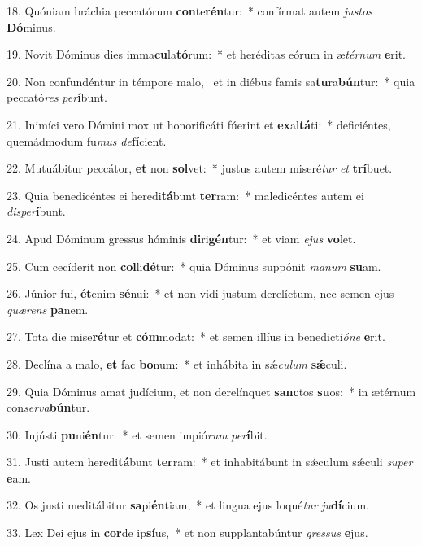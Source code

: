18. Quóniam bráchia peccatórum \textbf{con}te\textbf{rén}tur:~*  confírmat autem \textit{jus}\textit{tos} \textbf{Dó}minus.\

19. Novit Dóminus dies imma\textbf{cu}la\textbf{tó}rum:~*  et heréditas eórum in æ\textit{tér}\textit{num} \textbf{e}rit.\

20. Non confundéntur in témpore malo, \dag\  et in diébus famis sa\textbf{tu}ra\textbf{bún}tur:~*  quia peccató\textit{res} \textit{per}\textbf{í}bunt.\

21. Inimíci vero Dómini mox ut honorificáti fúerint et \textbf{ex}al\textbf{tá}ti:~*  deficiéntes, quemádmodum fu\textit{mus} \textit{de}\textbf{fí}cient.\

22. Mutuábitur peccátor, \textbf{et} non \textbf{sol}vet:~*  justus autem miseré\textit{tur} \textit{et} \textbf{trí}buet.\

23. Quia benedicéntes ei heredi\textbf{tá}bunt \textbf{ter}ram:~*  maledicéntes autem ei \textit{dis}\textit{per}\textbf{í}bunt.\

24. Apud Dóminum gressus hóminis \textbf{di}ri\textbf{gén}tur:~*  et viam \textit{e}\textit{jus} \textbf{vo}let.\

25. Cum cecíderit non \textbf{col}li\textbf{dé}tur:~*  quia Dóminus suppónit \textit{ma}\textit{num} \textbf{su}am.\

26. Júnior fui, \textbf{ét}enim \textbf{sé}nui:~*  et non vidi justum derelíctum, nec semen ejus \textit{quæ}\textit{rens} \textbf{pa}nem.\

27. Tota die mise\textbf{ré}tur et \textbf{cóm}modat:~*  et semen illíus in benedicti\textit{ó}\textit{ne} \textbf{e}rit.\

28. Declína a malo, \textbf{et} fac \textbf{bo}num:~*  et inhábita in sǽ\textit{cu}\textit{lum} \textbf{sǽ}culi.\

29. Quia Dóminus amat judícium, et non derelínquet \textbf{sanc}tos \textbf{su}os:~*  in ætérnum con\textit{ser}\textit{va}\textbf{bún}tur.\

30. Injústi \textbf{pu}ni\textbf{én}tur:~*  et semen impió\textit{rum} \textit{per}\textbf{í}bit.\

31. Justi autem heredi\textbf{tá}bunt \textbf{ter}ram:~*  et inhabitábunt in sǽculum sǽculi \textit{su}\textit{per} \textbf{e}am.\

32. Os justi meditábitur \textbf{sa}pi\textbf{én}tiam,~*  et lingua ejus loqué\textit{tur} \textit{ju}\textbf{dí}cium.\

33. Lex Dei ejus in \textbf{cor}de ip\textbf{sí}us,~*  et non supplantabúntur \textit{gres}\textit{sus} \textbf{e}jus.\

